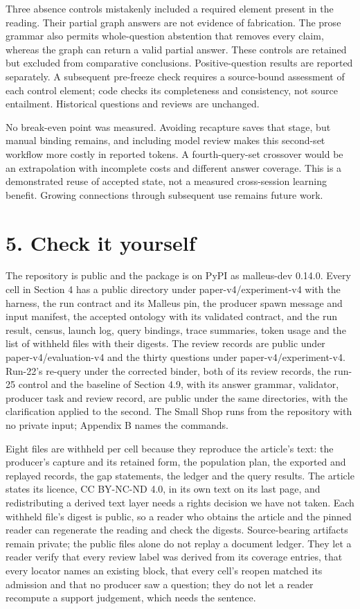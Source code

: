 Three absence controls mistakenly included a required element present in the reading. Their partial graph answers are not evidence of fabrication. The prose grammar also permits whole-question abstention that removes every claim, whereas the graph can return a valid partial answer. These controls are retained but excluded from comparative conclusions. Positive-question results are reported separately. A subsequent pre-freeze check requires a source-bound assessment of each control element; code checks its completeness and consistency, not source entailment. Historical questions and reviews are unchanged.

No break-even point was measured. Avoiding recapture saves that stage, but manual binding remains, and including model review makes this second-set workflow more costly in reported tokens. A fourth-query-set crossover would be an extrapolation with incomplete costs and different answer coverage. This is a demonstrated reuse of accepted state, not a measured cross-session learning benefit. Growing connections through subsequent use remains future work.

\section*{5. Check it yourself}

The repository is public and the package is on PyPI as malleus-dev 0.14.0. Every cell in Section 4 has a public directory under paper-v4/experiment-v4 with the harness, the run contract and its Malleus pin, the producer spawn message and input manifest, the accepted ontology with its validated contract, and the run result, census, launch log, query bindings, trace summaries, token usage and the list of withheld files with their digests. The review records are public under paper-v4/evaluation-v4 and the thirty questions under paper-v4/experiment-v4. Run-22's re-query under the corrected binder, both of its review records, the run-25 control and the baseline of Section 4.9, with its answer grammar, validator, producer task and review record, are public under the same directories, with the clarification applied to the second. The Small Shop runs from the repository with no private input; Appendix B names the commands.

Eight files are withheld per cell because they reproduce the article's text: the producer's capture and its retained form, the population plan, the exported and replayed records, the gap statements, the ledger and the query results. The article states its licence, CC BY-NC-ND 4.0, in its own text on its last page, and redistributing a derived text layer needs a rights decision we have not taken. Each withheld file's digest is public, so a reader who obtains the article and the pinned reader can regenerate the reading and check the digests. Source-bearing artifacts remain private; the public files alone do not replay a document ledger. They let a reader verify that every review label was derived from its coverage entries, that every locator names an existing block, that every cell's reopen matched its admission and that no producer saw a question; they do not let a reader recompute a support judgement, which needs the sentence.

